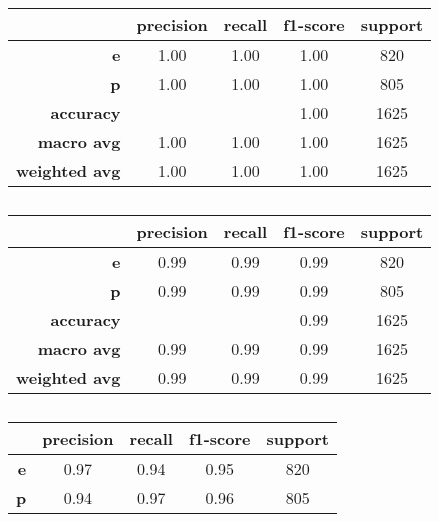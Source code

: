 \begin{latin}
\begin{table}[h!]
  \begin{center}
    \caption{}
    \label{DECTRE_TAB_6}
    \begin{tabular}{r|c|c|c|c} %
  & \textbf{precision}  & \textbf{recall} & \textbf{f1-score} & \textbf{support} \\
      \hline

         \textbf{e} & 1.00 & 1.00 & 1.00 & 820 \\
         \textbf{p} & 1.00 & 1.00 & 1.00 & 805 \\

    \textbf{accuracy} & & & 1.00 & 1625 \\
   \textbf{macro avg} & 1.00 & 1.00 & 1.00 & 1625 \\
\textbf{weighted avg} & 1.00 & 1.00 & 1.00 & 1625
    \end{tabular}
  \end{center}
\end{table}

\begin{table}[h!]
  \begin{center}
    \caption{}
    \label{DECTRE_TAB_3}
    \begin{tabular}{r|c|c|c|c} %
  & \textbf{precision}  & \textbf{recall} & \textbf{f1-score} & \textbf{support} \\
      \hline

           \textbf{e} & 0.99 & 0.99 & 0.99 & 820 \\
           \textbf{p} & 0.99 & 0.99 & 0.99 & 805 \\

    \textbf{accuracy} & & & 0.99 & 1625 \\
   \textbf{macro avg} & 0.99 & 0.99 & 0.99 & 1625 \\
\textbf{weighted avg} & 0.99 & 0.99 & 0.99 & 1625
    \end{tabular}
  \end{center}
\end{table}

\begin{table}[h!]
  \begin{center}
    \caption{}
    \label{DECTRE_TAB_2}
    \begin{tabular}{r|c|c|c|c} %
  & \textbf{precision}  & \textbf{recall} & \textbf{f1-score} & \textbf{support} \\
      \hline
           \textbf{e} & 0.97 & 0.94 & 0.95 & 820 \\
           \textbf{p} & 0.94 & 0.97 & 0.96 & 805 \\


\end{tabular}
\end{center}
\end{table}
\end{latin}
